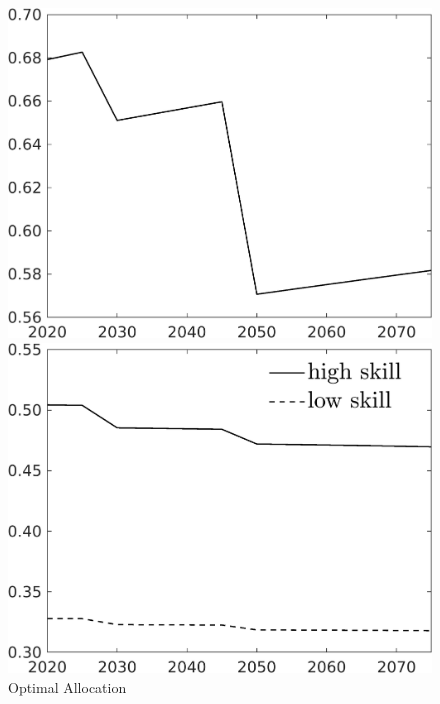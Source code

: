\begin{figure}[h!!]
	\centering
	\caption{Optimal Allocation }\label{fig:optAll}
	
	
	\begin{minipage}[]{0.32\textwidth}
		\includegraphics[width=1\textwidth]{../../codding_model/own_basedOnFried/optimalPol_elastS_DisuSci/figures/all_1705/Single_OPT_T_NoTaus_C_spillover0_sep1_BN0_ineq0_red0_etaa0.79.png}
	\end{minipage}
	\begin{minipage}[]{0.32\textwidth}
		\includegraphics[width=1\textwidth]{../../codding_model/own_basedOnFried/optimalPol_elastS_DisuSci/figures/all_1705/SingleJointTOT_OPT_T_NoTaus_labour_spillover0_sep1_BN0_ineq0_red0_etaa0.79_lgd1.png}

\end{minipage}
\end{figure}
